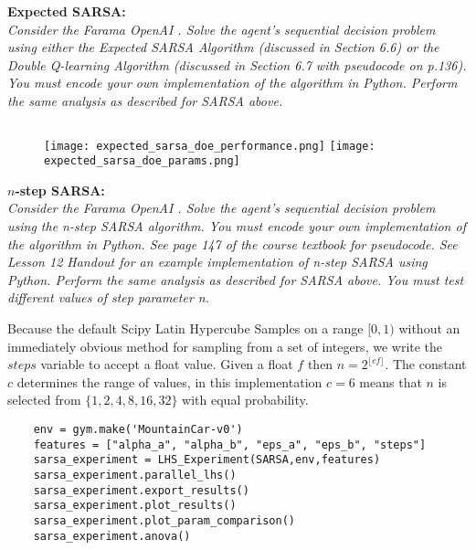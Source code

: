 \documentclass[12pt,letterpaper]{exam}
\begin{document}
\begin{questions}

\question%
\textbf{Expected SARSA:} \\
\emph{ 
Consider the Farama OpenAI .
Solve the agent's sequential decision problem using either the 
Expected SARSA Algorithm (discussed in Section 6.6) or 
the Double Q-learning Algorithm (discussed in Section 6.7 with pseudocode on p.136). 
You must encode your own implementation of the algorithm in Python. 
Perform the same analysis as described for SARSA above.
}
\inputminted{python3}{scripts/ExpectedSARSA.py}
\begin{figure}[H]
    \texttt{[image: expected\_sarsa\_doe\_performance.png]}
    \texttt{[image: expected\_sarsa\_doe\_params.png]}
\end{figure}
{\footnotesize{}}


\question%
\textbf{\(n\)-step SARSA:} \\
\emph{ 
Consider the Farama OpenAI .
Solve the agent's sequential decision problem using the n-step SARSA algorithm. 
You must encode your own implementation of the algorithm in Python. 
See page 147 of the course textbook for pseudocode. See Lesson 12 Handout for an example 
implementation of n-step SARSA using Python. 
Perform the same analysis as described for SARSA above. 
You must test different values of step parameter n.
}

\begin{solution}
    Because the default Scipy Latin Hypercube Samples on a range \([0,1)\) without
    an immediately obvious method for sampling from a set of integers, we write
    the \(steps\) variable to accept a float value.
    Given a float \(f\) then \(n=2^{\lfloor cf \rfloor}\).
    The constant \(c\) determines the range of values,
    in this implementation \(c=6\) means that \(n\) is selected from \(\{1,2,4,8,16,32\}\)
    with equal probability.
\end{solution}

\begin{verbatim}
    env = gym.make('MountainCar-v0')
    features = ["alpha_a", "alpha_b", "eps_a", "eps_b", "steps"]
    sarsa_experiment = LHS_Experiment(SARSA,env,features)
    sarsa_experiment.parallel_lhs()
    sarsa_experiment.export_results()
    sarsa_experiment.plot_results()
    sarsa_experiment.plot_param_comparison()
    sarsa_experiment.anova()
\end{verbatim}


\end{questions}
\end{document}
